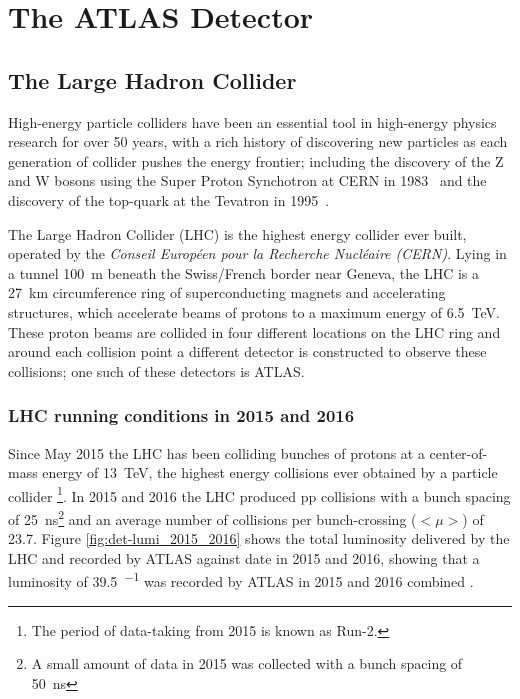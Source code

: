 \chapter{The ATLAS Detector}
\label{sec:det}

\section{The Large Hadron Collider}
\label{sec:det-LHC}

High-energy particle colliders have been an essential tool in high-energy physics research for over 50 years,
with a rich history of discovering new particles as each generation of collider pushes the energy frontier;
including the discovery of the Z and W bosons using the Super Proton Synchotron at CERN in 1983~\cite{det-Wdisc_UA1, det-Zdisc_UA1, det-Wdisc_UA2, det-Zdisc_UA2} 
and the discovery of the  top-quark at the Tevatron in 1995~\cite{det-tdisc_CDF, det-tdisc_D0}.

The Large Hadron Collider (LHC) is the highest energy collider ever built,
operated by the \textit{Conseil Europ\'een pour la Recherche Nucl\'eaire (CERN)}.
Lying in a tunnel \SI{100}{\metre} beneath the Swiss/French border near Geneva,
the LHC is a \SI{27}{\km} circumference ring of superconducting magnets and accelerating structures,
which accelerate beams of protons to a maximum energy of \SI{6.5}{\TeV}.
These proton beams are collided in four different locations on the LHC ring
and around each collision point a different detector is constructed to observe these collisions;
one such of these detectors is ATLAS.

\subsection{LHC running conditions in 2015 and 2016}

Since May 2015 the LHC has been colliding bunches of protons at a center-of-mass energy of \SI{13}{\TeV},
the highest energy collisions ever obtained by a particle collider
\footnote{The period of data-taking from 2015 is known as Run-2.}.
In 2015 and 2016 the LHC produced pp collisions 
with a bunch spacing of \SI{25}{\nano\second}\footnote{A small amount of data in 2015 was collected with a bunch spacing of \SI{50}{\nano\second}}
and an average number of collisions per bunch-crossing ($<\mu>$) of 23.7.
Figure \ref{fig:det-lumi_2015_2016} shows the total luminosity
delivered by the LHC and recorded by ATLAS against date in 2015 and 2016,
showing that a luminosity of \SI{39.5}{\fb^{-1}} was recorded by ATLAS in 2015 and 2016 combined \cite{det-ATLAS_lumi_twiki}.

